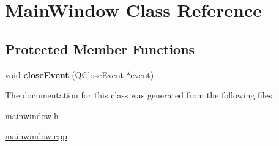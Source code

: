 \hypertarget{classMainWindow}{
\section{MainWindow Class Reference}
\label{classMainWindow}
}
\subsection*{Protected Member Functions}
\begin{DoxyCompactItemize}
\item 
\hypertarget{classMainWindow_a4e20a4a065fbb0e4d3532a45a0a91425}{
void {\bfseries closeEvent} (QCloseEvent $\ast$event)}
\label{classMainWindow_a4e20a4a065fbb0e4d3532a45a0a91425}

\end{DoxyCompactItemize}


The documentation for this class was generated from the following files:\begin{DoxyCompactItemize}
\item 
mainwindow.h\item 
\hyperlink{mainwindow_8cpp}{mainwindow.cpp}\end{DoxyCompactItemize}
